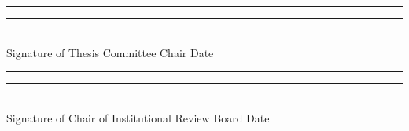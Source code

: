\vspace{1.2cm}

\noindent
\rule{2.5in}{0.4pt}
\hfill
\rule{1.5in}{0.4pt}
\\
Signature of Thesis Committee Chair
\hfill
Date

\vspace{1.2cm}

\noindent
\rule{3.2in}{0.4pt}
\hfill
\rule{1.5in}{0.4pt}
\\
Signature of Chair of Institutional Review Board
\hfill
Date


\cleardoublepage
{}



\renewcommand{\contentsname}{Table of Contents}
\tableofcontents

\cleardoublepage
{}



\listoffigures

\cleardoublepage
{}



\listoftables

\cleardoublepage
{}




\setcounter{page}{1}
